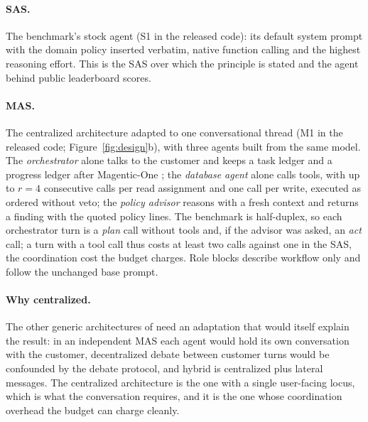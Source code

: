 \paragraph{SAS.} The benchmark's stock agent (S1 in the released code): its default system prompt with the domain policy inserted verbatim, native function calling and the highest reasoning effort. This is the SAS over which the principle is stated and the agent behind public leaderboard scores.

\paragraph{MAS.} The centralized architecture adapted to one conversational thread (M1 in the released code; Figure~\ref{fig:design}b), with three agents built from the same model. The \emph{orchestrator} alone talks to the customer and keeps a task ledger and a progress ledger after Magentic-One \citep{fourney2024magentic}; the \emph{database agent} alone calls tools, with up to $r=4$ consecutive calls per read assignment and one call per write, executed as ordered without veto; the \emph{policy advisor} reasons with a fresh context and returns a finding with the quoted policy lines. The benchmark is half-duplex, so each orchestrator turn is a \emph{plan} call without tools and, if the advisor was asked, an \emph{act} call; a turn with a tool call thus costs at least two calls against one in the SAS, the coordination cost the budget charges. Role blocks describe workflow only and follow the unchanged base prompt.

\paragraph{Why centralized.} The other generic architectures of \citet{kim2026capable} need an adaptation that would itself explain the result: in an independent MAS each agent would hold its own conversation with the customer, decentralized debate between customer turns would be confounded by the debate protocol, and hybrid is centralized plus lateral messages. The centralized architecture is the one with a single user-facing locus, which is what the conversation requires, and it is the one whose coordination overhead the budget can charge cleanly.

